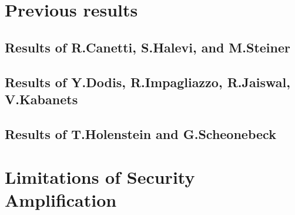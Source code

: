 \documentclass[11pt,a4paper,titlepage]{memoir}
\begin{document}


\section{Previous results}
\label{st:previous_results}
\subsection{Results of R.Canetti, S.Halevi, and M.Steiner}
\subsection{Results of Y.Dodis, R.Impagliazzo, R.Jaiswal, V.Kabanets}
\subsection{Results of T.Holenstein and G.Scheonebeck}
\section{Limitations of Security Amplification}



\appendix


\backmatter



\end{document}
